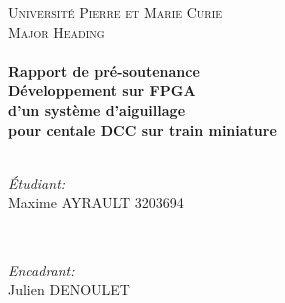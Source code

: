 \begin{titlepage}

\center %
 

\textsc{\LARGE Université Pierre et Marie Curie}\\[1.5cm] %
\textsc{\Large Major Heading}\\[0.5cm] %


\HRule \\[0.4cm]
{ \huge \bfseries Rapport de pré-soutenance}\\[0.4cm] %
{ \huge \bfseries Développement sur FPGA \\d'un système d'aiguillage
  \\pour centale DCC sur train miniature}\\[0.4cm] %
\HRule \\[1.5cm]
 

\begin{minipage}{0.4\textwidth}
\begin{flushleft} \large
\emph{\'Etudiant:}\\
Maxime \textsc{AYRAULT} 3203694 %
\end{flushleft}
\end{minipage}
~
\begin{minipage}{0.4\textwidth}
\begin{flushright} \large
\emph{Encadrant:} \\
Julien \textsc{DENOULET} %
\end{flushright}
\end{minipage}\\[2cm]



\end{titlepage}
